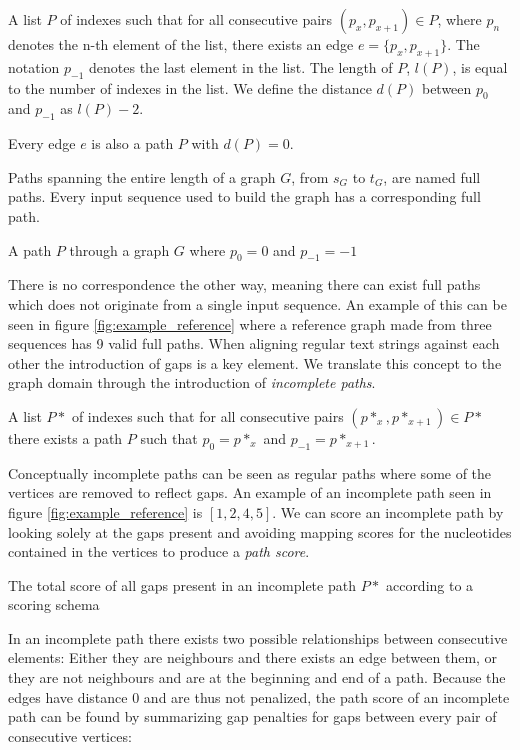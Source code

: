 \documentclass[thesis.tex]{subfiles}
\begin{document}
{\begin{defn}
  A list $P$ of indexes such that for all consecutive pairs $(p_x, p_{x+1}) \in P$, where $p_n$ denotes the n-th element of the list, there exists an edge $e=\{p_x, p_{x+1}\}$. The notation $p_{-1}$ denotes the last element in the list. The length of $P$, $l(P)$, is equal to the number of indexes in the list. We define the distance $d(P)$ between $p_0$ and $p_{-1}$ as $l(P) - 2$.
\end{defn}
\begin{corollary}
  Every edge $e$ is also a path $P$ with $d(P)=0$.
\end{corollary}
Paths spanning the entire length of a graph $G$, from $s_G$ to $t_G$, are named full paths. Every input sequence used to build the graph has a corresponding full path.
\begin{defn}
  A path $P$ through a graph $G$ where $p_0=0$ and $p_{-1}=-1$
\end{defn}
There is no correspondence the other way, meaning there can exist full paths which does not originate from a single input sequence. An example of this can be seen in figure \ref{fig:example_reference} where a reference graph made from three sequences has 9 valid full paths. When aligning regular text strings against each other the introduction of gaps is a key element. We translate this concept to the graph domain through the introduction of \textit{incomplete paths}.
\begin{defn}
  A list $P*$ of indexes such that for all consecutive pairs $(p*_x, p*_{x+1}) \in P*$ there exists a path $P$ such that $p_0=p*_x$ and $p_{-1}=p*_{x+1}$.
\end{defn}
Conceptually incomplete paths can be seen as regular paths where some of the vertices are removed to reflect gaps. An example of an incomplete path seen in figure \ref{fig:example_reference} is $[1, 2, 4, 5]$. We can score an incomplete path by looking solely at the gaps present and avoiding mapping scores for the nucleotides contained in the vertices to produce a \textit{path score}. 
\begin{defn}
  The total score of all gaps present in an incomplete path $P*$ according to a scoring schema
\end{defn}
In an incomplete path there exists two possible relationships between consecutive elements: Either they are neighbours and there exists an edge between them, or they are not neighbours and are at the beginning and end of a path. Because the edges have distance $0$ and are thus not penalized, the path score of an incomplete path can be found by summarizing gap penalties for gaps between every pair of consecutive vertices:
}
\end{document}
